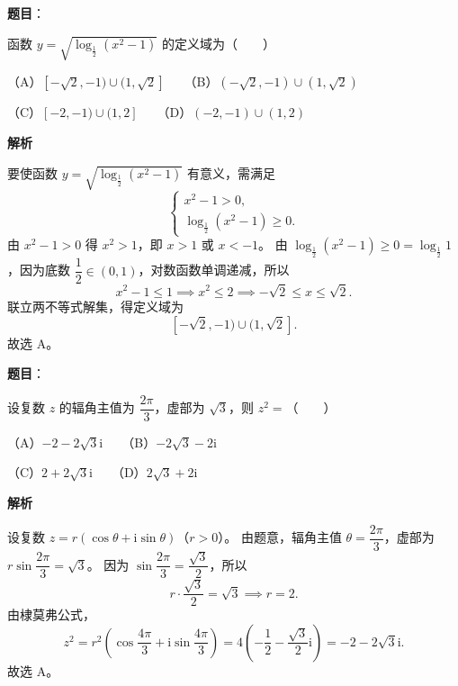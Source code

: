 \begin{answer}

\textbf{题目}：

函数 $y=\sqrt{\log_{\frac{1}{2}}(x^2-1)}$ 的定义域为\mbox{（　　）}

（A）$[-\sqrt{2},-1)\cup(1,\sqrt{2}]$　　（B）$(-\sqrt{2},-1)\cup(1,\sqrt{2})$

（C）$[-2,-1)\cup(1,2]$　　（D）$(-2,-1)\cup(1,2)$

\textbf{解析}

要使函数 $y=\sqrt{\log_{\frac{1}{2}}(x^2-1)}$ 有意义，需满足
\nopagebreak[4]
\[
\begin{cases}
x^2-1>0,\\
\log_{\frac{1}{2}}(x^2-1)\geqslant 0.
\end{cases}
\]
由 $x^2-1>0$ 得 $x^2>1$，即 $x>1$ 或 $x<-1$。
由 $\log_{\frac{1}{2}}(x^2-1)\geqslant 0=\log_{\frac{1}{2}}1$，因为底数 $\dfrac{1}{2}\in(0,1)$，对数函数单调递减，所以
\nopagebreak[4]
\[
x^2-1\leqslant 1 \implies x^2\leqslant 2 \implies -\sqrt{2}\leqslant x\leqslant \sqrt{2}.
\]
联立两不等式解集，得定义域为
\nopagebreak[4]
\[
[-\sqrt{2},-1)\cup(1,\sqrt{2}].
\]
故选 A。


\end{answer}
\begin{answer}

\textbf{题目}：

设复数 $z$ 的辐角主值为 $\dfrac{2\pi}{3}$，虚部为 $\sqrt{3}$，则 $z^2=$\mbox{（　　）}

（A）$-2-2\sqrt{3}\mathrm{i}$　　（B）$-2\sqrt{3}-2\mathrm{i}$

（C）$2+2\sqrt{3}\mathrm{i}$　　（D）$2\sqrt{3}+2\mathrm{i}$

\textbf{解析}

设复数 $z=r(\cos\theta+\mathrm{i}\sin\theta)$（$r>0$）。
由题意，辐角主值 $\theta=\dfrac{2\pi}{3}$，虚部为 $r\sin\dfrac{2\pi}{3}=\sqrt{3}$。
因为 $\sin\dfrac{2\pi}{3}=\dfrac{\sqrt{3}}{2}$，所以
\nopagebreak[4]
\[
r\cdot\frac{\sqrt{3}}{2}=\sqrt{3} \implies r=2.
\]
由棣莫弗公式，
\nopagebreak[4]
\[
z^2=r^2\left(\cos\frac{4\pi}{3}+\mathrm{i}\sin\frac{4\pi}{3}\right)=4\left(-\frac{1}{2}-\frac{\sqrt{3}}{2}\mathrm{i}\right)=-2-2\sqrt{3}\mathrm{i}.
\]
故选 A。


\end{answer}
